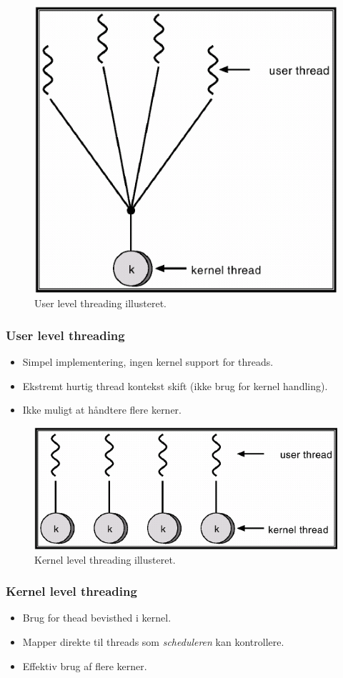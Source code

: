 \begin{figure}[h]
	\centering
	\includegraphics[width=0.7\linewidth]{figs/userthreads}
	\caption{User level threading illusteret.}
	\label{fig:userthreads}
\end{figure}

\subsubsection*{User level threading}
\begin{itemize}
	\item Simpel implementering, ingen kernel support for threads.
	\item Ekstremt hurtig thread kontekst skift (ikke brug for kernel handling).
	\item Ikke muligt at håndtere flere kerner.
\end{itemize}

\begin{figure}[h]
	\centering
	\includegraphics[width=0.7\linewidth]{figs/kernelthreads}
	\caption{Kernel level threading illusteret.}
	\label{fig:kernelthreads}
\end{figure}

\subsubsection*{Kernel level threading}
\begin{itemize}
	\item Brug for thead bevisthed i kernel.
	\item Mapper direkte til threads som \textit{scheduleren} kan kontrollere.
	\item Effektiv brug af flere kerner.
\end{itemize}

